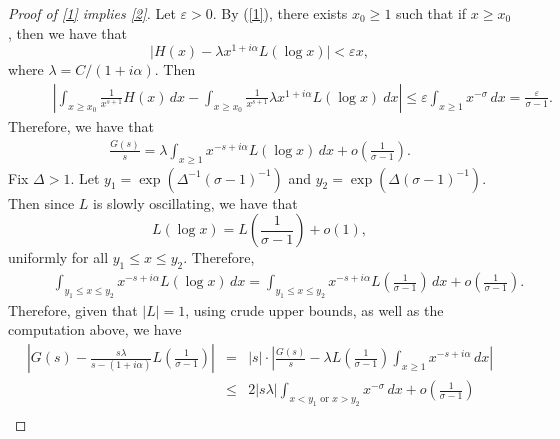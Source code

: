 \documentclass[10pt,a4paper]{amsart}
\newcommand{\NN}{{\mathcal N}}
\newcommand{\e}{\epsilon}
\begin{document}
\begin{proof}[Proof of \eqref{1} implies \eqref{2}]
Let $\varepsilon>0$. By (\ref{1}), there exists $x_{0}\geq 1$ such that if $x \geq x_{0}$, then we have that 
 $$\vert H(x)-\lambda x^{1+i\alpha}L(\log x)\vert<\varepsilon x,$$
 where $\lambda=C/(1+i\alpha)$. Then
     \begin{equation}\nonumber
    \begin{split}
    &\qquad \left| \int_{x \geq x_{0}}\frac{1}{x^{s+1}}H(x)\,dx-\int_{x\geq x_{0}}\frac{1}{x^{s+1}}\lambda x^{1+i\alpha}L(\log x) \ dx\right|
   \leq %
    \varepsilon\int_{x\geq 1} x^{-\sigma}\,dx = \frac{\varepsilon}{\sigma-1}.
    \end{split}
 \end{equation} 
  Therefore, we have that 
  \begin{equation}\nonumber
    \begin{split}
    \frac{G(s)}{s}=\lambda \int_{x\geq 1} x^{-s+i\alpha}L(\log  x)\,dx+o\left(\frac{1}{\sigma-1}\right).
    \end{split}
 \end{equation}
 Fix $\Delta>1$. Let $y_{1}=\exp(\Delta^{-1}(\sigma-1)^{-1})$ and  $y_{2}=\exp(\Delta(\sigma-1)^{-1})$. Then since $L$ is slowly oscillating, we have that
 $$L(\log  x)=L\left(\frac{1}{\sigma-1}\right)+o(1),$$
 uniformly for all $y_{1}\leq  x\leq y_{2}$. Therefore, 
   \begin{equation}\nonumber
    \begin{split}
   &\qquad \int_{y_{1}\leq x\leq y_{2}}x^{-s+i\alpha}L(\log x)\,dx
   =\int_{ y_{1}\leq x\leq y_{2}}x^{-s+i\alpha}L\left(\frac{1}{\sigma-1}\right)\,dx+o\left(\frac{1}{\sigma-1}\right).
    \end{split}
 \end{equation}
Therefore, given that $|L|=1$, using crude upper bounds, as well as the computation above, we have
  \begin{eqnarray*}
      \left|G(s)-\frac{s\lambda}{s-(1+i\alpha)} L\left(\frac{1}{\sigma-1}\right) \right|
   & = & \vert s\vert\cdot\left|\frac{G(s)}{s}-\lambda L\left(\frac{1}{\sigma-1}\right) \int_{x\geq 1}x^{-s+i\alpha}\,dx\right|
   \\ &\leq & 2\vert s\lambda\vert\int_{x<y_{1} \text{ or } x>y_{2}} x^{-\sigma}\,dx+o\left(\frac{1}{\sigma-1}\right)\\

\end{eqnarray*}
\end{proof}
\end{document}
